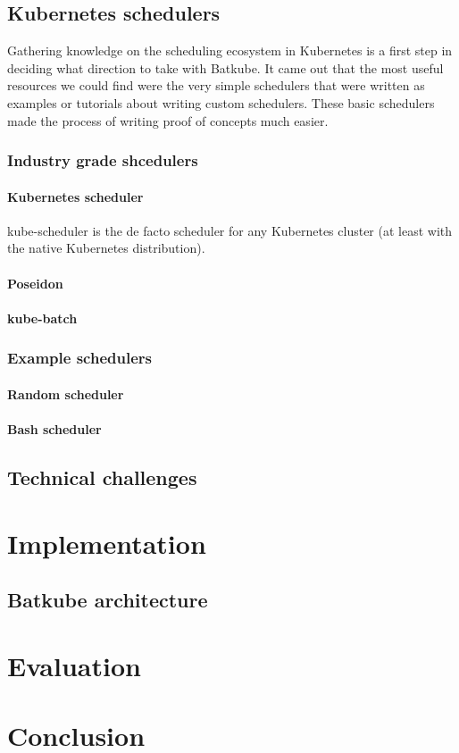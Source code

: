\documentclass[12pt]{report}
\begin{document}
\section{Kubernetes schedulers}

Gathering knowledge on the scheduling ecosystem in Kubernetes is a first step
in deciding what direction to take with Batkube. It came out that the most
useful resources we could find were the very simple schedulers that were
written as examples or tutorials about writing custom schedulers. These basic
schedulers made the process of writing proof of concepts much easier.


\subsection{Industry grade shcedulers}

\subsubsection{Kubernetes scheduler}
kube-scheduler\cite{kube-sched} is the de facto scheduler for any Kubernetes
cluster (at least with the native Kubernetes distribution).


\subsubsection{Poseidon}

\subsubsection{kube-batch}

\subsection{Example schedulers}
\subsubsection{Random scheduler}

\subsubsection{Bash scheduler}

\section{Technical challenges}

\chapter{Implementation}

\section{Batkube architecture}

\chapter{Evaluation}

\chapter{Conclusion}


\printbibliography
\end{document}
